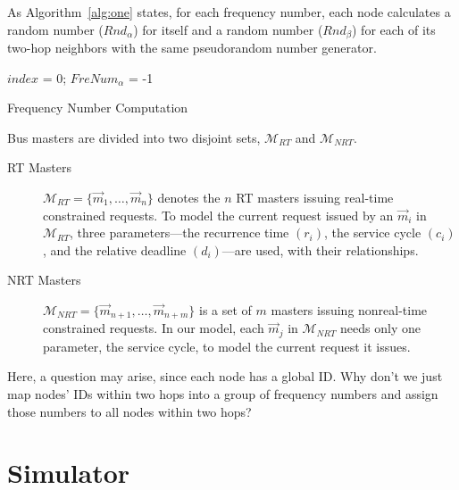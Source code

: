 \documentclass[prodmode,acmtecs]{acmsmall}
\begin{document}
As Algorithm~\ref{alg:one} states, for each frequency
number, each node calculates a random number (${\textit{Rnd}}_{\alpha}$) for
itself and a random number (${\textit{Rnd}}_{\beta}$) for each of its two-hop
neighbors with the same pseudorandom number generator.
\begin{algorithm}[t]
\SetAlgoNoLine
{}
$index$ = 0; $FreNum_{\alpha}$ = -1\;
\caption{Frequency Number Computation}
\label{alg:one}
\end{algorithm}

Bus masters are divided into two disjoint sets, $\mathcal{M}_{RT}$
and $\mathcal{M}_{NRT}$.
\begin{description}
\item[RT Masters]
$\mathcal{M}_{RT}=\{ \vec{m}_{1},\dots,\vec{m}_{n}\}$ denotes the
$n$ RT masters issuing real-time constrained requests. To model the
current request issued by an $\vec{m}_{i}$ in $\mathcal{M}_{RT}$,
three parameters---the recurrence time $(r_i)$, the service cycle
$(c_i)$, and the relative deadline $(d_i)$---are used, with their
relationships.
\item[NRT Masters]
$\mathcal{M}_{NRT}=\{ \vec{m}_{n+1},\dots,\vec{m}_{n+m}\}$ is a set
of $m$ masters issuing nonreal-time constrained requests. In our
model, each $\vec{m}_{j}$ in $\mathcal{M}_{NRT}$ needs only one
parameter, the service cycle, to model the current request it
issues.
\end{description}

Here, a question may arise, since each node has a global ID. Why
don't we just map nodes' IDs within two hops into a group of
frequency numbers and assign those numbers to all nodes within two
hops?

\section{Simulator}
\label{sec:sim}
\end{document}

